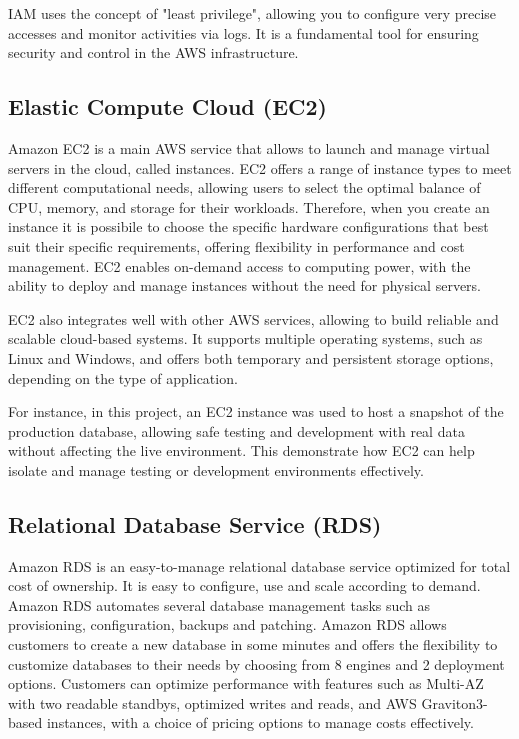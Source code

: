 IAM uses the concept of "least privilege", allowing you to configure very precise accesses and monitor activities via logs. It is a fundamental tool for ensuring security and control in the \ac{AWS} infrastructure.
\subsection{Elastic Compute Cloud (EC2)}
Amazon \acf{EC2} is a main \ac{AWS} service that allows to launch and manage virtual servers in the cloud, called instances. \ac{EC2} offers a range of instance types to meet different computational needs, allowing users to select the optimal balance of CPU, memory, and storage for their workloads. Therefore, when you create an instance it is possibile to choose the specific hardware configurations that best suit their specific requirements, offering flexibility in performance and cost management. \ac{EC2} enables on-demand access to computing power, with the ability to deploy and manage instances without the need for physical servers.

\ac{EC2} also integrates well with other \ac{AWS} services, allowing to build reliable and scalable cloud-based systems. It supports multiple operating systems, such as Linux and Windows, and offers both temporary and persistent storage options, depending on the type of application.

For instance, in this project, an \ac{EC2} instance was used to host a snapshot of the production database, allowing safe testing and development with real data without affecting the live environment. This demonstrate how \ac{EC2} can help isolate and manage testing or development environments effectively.
\subsection{Relational Database Service (RDS)}
Amazon \ac{RDS} is an easy-to-manage relational database service optimized for total cost of ownership. It is easy to configure, use and scale according to demand. Amazon \ac{RDS} automates several database management tasks such as provisioning, configuration, backups and patching. Amazon \ac{RDS} allows customers to create a new database in some minutes and offers the flexibility to customize databases to their needs by choosing from 8 engines and 2 deployment options. Customers can optimize performance with features such as Multi-AZ with two readable standbys, optimized writes and reads, and \ac{AWS} Graviton3-based instances, with a choice of pricing options to manage costs effectively.

